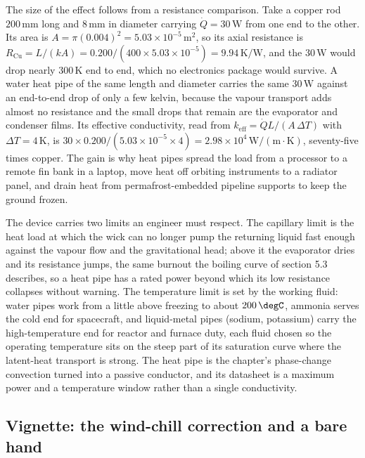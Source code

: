 The size of the effect follows from a resistance comparison. Take a copper
rod $200\,\si{\milli\meter}$ long and $8\,\si{\milli\meter}$ in diameter
carrying $\dot{Q} = 30\,\text{W}$ from one end to the other. Its area is
$A = \pi(0.004)^2 = 5.03\times10^{-5}\,\text{m}^2$, so its axial resistance
is $R_{\text{Cu}} = L/(kA) = 0.200/(400\times5.03\times10^{-5}) = 9.94\,
\si{\kelvin}/\text{W}$, and the $30\,\text{W}$ would drop nearly
$300\,\si{\kelvin}$ end to end, which no electronics package would survive.
A water heat pipe of the same length and diameter carries the same
$30\,\text{W}$ against an end-to-end drop of only a few kelvin, because the
vapour transport adds almost no resistance and the small drops that remain
are the evaporator and condenser films. Its effective conductivity, read
from $k_{\text{eff}} = \dot{Q}L/(A\,\Delta T)$ with $\Delta T = 4\,\si{
\kelvin}$, is $30\times0.200/(5.03\times10^{-5}\times4) = 2.98\times10^4\,
\text{W}/(\text{m}\cdot\si{\kelvin})$, seventy-five times copper. The gain
is why heat pipes spread the load from a processor to a remote fin bank in
a laptop, move heat off orbiting instruments to a radiator panel, and drain
heat from permafrost-embedded pipeline supports to keep the ground frozen.

The device carries two limits an engineer must respect. The capillary limit
is the heat load at which the wick can no longer pump the returning liquid
fast enough against the vapour flow and the gravitational head; above it the
evaporator dries and its resistance jumps, the same burnout the boiling
curve of section 5.3 describes, so a heat pipe has a rated power beyond which
its low resistance collapses without warning. The temperature limit is set
by the working fluid: water pipes work from a little above freezing to about
$200\,\degC$, ammonia serves the cold end for spacecraft, and liquid-metal
pipes (sodium, potassium) carry the high-temperature end for reactor and
furnace duty, each fluid chosen so the operating temperature sits on the
steep part of its saturation curve where the latent-heat transport is
strong. The heat pipe is the chapter's phase-change convection turned into
a passive conductor, and its datasheet is a maximum power and a temperature
window rather than a single conductivity.

\subsection{Vignette: the wind-chill correction and a bare hand}

